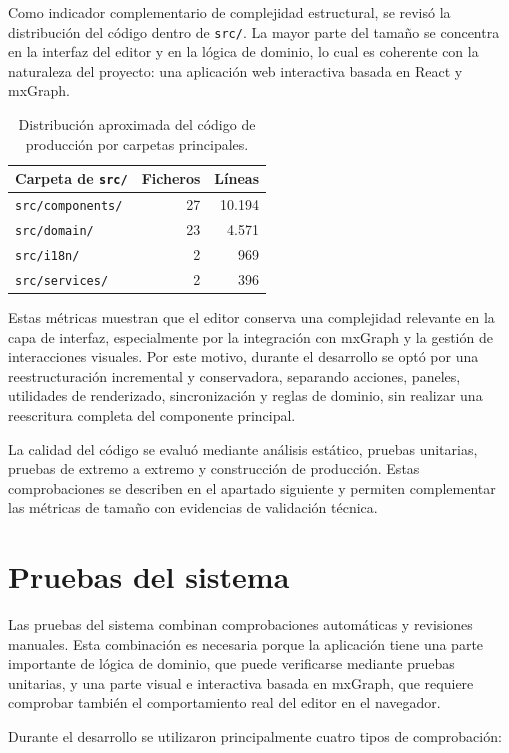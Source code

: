 Como indicador complementario de complejidad estructural, se revisó la distribución del código dentro de \texttt{src/}. La mayor parte del tamaño se concentra en la interfaz del editor y en la lógica de dominio, lo cual es coherente con la naturaleza del proyecto: una aplicación web interactiva basada en React y mxGraph.

\begin{table}[H]
\centering
\small
\renewcommand{\arraystretch}{1.2}
\begin{tabular}{p{} r r}
\toprule
\textbf{Carpeta de \texttt{src/}} & \textbf{Ficheros} & \textbf{Líneas} \tabularnewline
\midrule
\texttt{src/components/} & 27 & 10.194 \tabularnewline
\texttt{src/domain/} & 23 & 4.571 \tabularnewline
\texttt{src/i18n/} & 2 & 969 \tabularnewline
\texttt{src/services/} & 2 & 396 \tabularnewline
\bottomrule
\end{tabular}
\caption{Distribución aproximada del código de producción por carpetas principales.}
\label{tab:metricas_codigo_carpetas}
\end{table}

Estas métricas muestran que el editor conserva una complejidad relevante en la capa de interfaz, especialmente por la integración con mxGraph y la gestión de interacciones visuales. Por este motivo, durante el desarrollo se optó por una reestructuración incremental y conservadora, separando acciones, paneles, utilidades de renderizado, sincronización y reglas de dominio, sin realizar una reescritura completa del componente principal.

La calidad del código se evaluó mediante análisis estático, pruebas unitarias, pruebas de extremo a extremo y construcción de producción. Estas comprobaciones se describen en el apartado siguiente y permiten complementar las métricas de tamaño con evidencias de validación técnica.

\section{Pruebas del sistema}

Las pruebas del sistema combinan comprobaciones automáticas y revisiones manuales. Esta combinación es necesaria porque la aplicación tiene una parte importante de lógica de dominio, que puede verificarse mediante pruebas unitarias, y una parte visual e interactiva basada en mxGraph, que requiere comprobar también el comportamiento real del editor en el navegador.

Durante el desarrollo se utilizaron principalmente cuatro tipos de comprobación:

